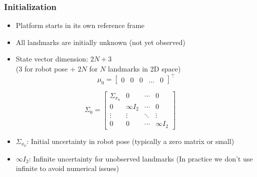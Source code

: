 \begin{frame}
    \frametitle{Initialization}

    \begin{itemize}
        \item Platform starts in its own reference frame
        \item All landmarks are initially unknown (not yet observed)
        \item State vector dimension: $2N + 3$ \\
        (3 for robot pose + $2N$ for $N$ landmarks in 2D space)
        \begin{equation*}
            \mu_0 =
            \begin{bmatrix}
                0 & 0 & 0 & \dots & 0    
            \end{bmatrix}^{\top}
        \end{equation*}
    \end{itemize}
    
    \begin{equation*}
        \Sigma_0 =
        \begin{bmatrix}
            \Sigma_{x_0} & 0 & \cdots & 0 \\
            0 & \infty I_{2} & \cdots & 0 \\
            \vdots & \vdots & \ddots & \vdots \\
            0 & 0 & \cdots & \infty I_{2}
        \end{bmatrix}
    \end{equation*}
    
    \begin{itemize}
        \item $\Sigma_{x_0}$: Initial uncertainty in robot pose (typically  a zero matrix or small)
        \item $\infty I_{2}$: Infinite uncertainty for unobserved landmarks (In practice we don't use infinite to avoid numerical issues)
    \end{itemize}


\end{frame}

